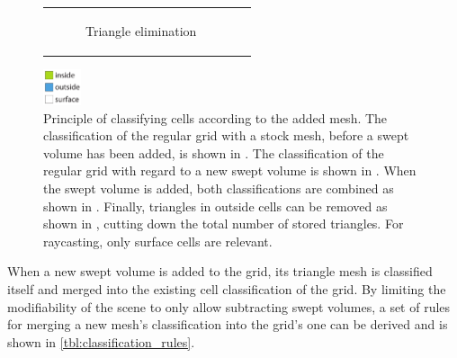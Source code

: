 \begin{figure}[!h]
\begin{tabular}{cc}
\begin{subfigure}[t]{0.3\textwidth}
			\caption{Triangle elimination}
			\label{fig:classification_after_removal}
		\end{subfigure}\\
	\end{tabular}
	\includegraphics[width=0.1\textwidth]{images/classification_legend}
	\caption{
		Principle of classifying cells according to the added mesh.
		The classification of the regular grid with a stock mesh, before a swept volume has been added, is shown in .
		The classification of the regular grid with regard to a new swept volume is shown in .
		When the swept volume is added, both classifications are combined as shown in .
		Finally, triangles in outside cells can be removed as shown in , cutting down the total number of stored triangles.
		For raycasting, only surface cells are relevant.
	}
	\label{fig:classification}
\end{figure}

When a new swept volume is added to the grid, its triangle mesh is classified itself and merged into the existing cell classification of the grid.
By limiting the modifiability of the scene to only allow subtracting swept volumes, a set of rules for merging a new mesh's classification into the grid's one can be derived and is shown in \cref{tbl:classification_rules}.

